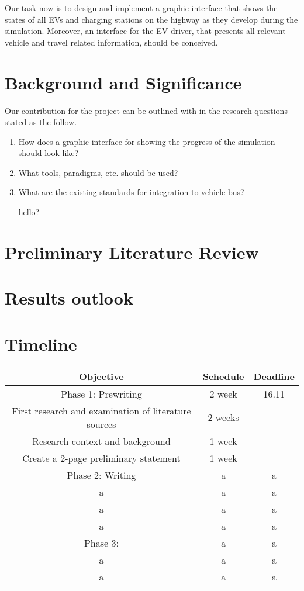 \documentclass{sig-alternate}
\begin{document}
Our task now is to design and implement a graphic interface that shows the states of all EVs and charging
stations on the highway as they develop during the simulation. Moreover, an interface for the EV driver, that
presents all relevant vehicle and travel related information, should be conceived.





\section{Background and Significance}
Our contribution for the project can be outlined with in the research questions stated as the follow.

\begin{enumerate}
\item 
How does a graphic interface for showing the progress of the
simulation should look like?

\item 
What tools, paradigms, etc. should be used?

\item 
What are the existing standards for integration to vehicle bus?

hello?
\end{enumerate}

\section{Preliminary Literature Review}
\section{Results outlook}
\section{Timeline}
\begin{tabular}{|c|c|c|}\hline
Objective & Schedule & Deadline\\\hline
Phase 1: Prewriting
 & 2 week & 16.11 \\\hline
First research and examination of literature sources
 & 2 weeks &  \\\hline
Research context and background & 1 week &  \\\hline
Create a 2-page preliminary statement  & 1 week &  \\\hline
Phase 2: Writing & a & a \\\hline
a & a & a \\\hline
a & a & a \\\hline
a & a & a \\\hline
Phase 3: & a & a \\\hline
a & a & a \\\hline
a & a & a \\\hline
\end{tabular}
\end{document}

